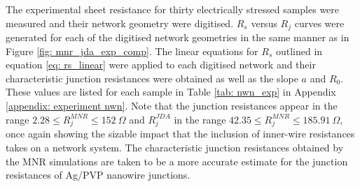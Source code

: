 The experimental sheet resistance for thirty electrically stressed samples were measured and their network geometry were digitised. $R_s$ versus $R_j$ curves were generated for each of the digitised network geometries in the same manner as in Figure \ref{fig: mnr_jda_exp_comp}. The linear equations for $R_s$ outlined in equation \ref{eq: rs_linear} were applied to each digitised network and their characteristic junction resistances were obtained as well as the slope $a$ and $R_0$. These values are listed for each sample in Table \ref{tab: nwn_exp} in Appendix \ref{appendix: experiment nwn}. Note that the junction resistances appear in the range $2.28\leq R^{MNR}_j \leq 152 ~ \Omega$ and $R^{JDA}_j$ in the range $42.35 \leq R^{MNR}_j \leq 185.91 ~ \Omega$, once again showing the sizable impact that the inclusion of inner-wire resistances takes on a network system. The characteristic junction resistances obtained by the MNR simulations are taken to be a more accurate estimate for the junction resistances of Ag/PVP nanowire junctions. %

